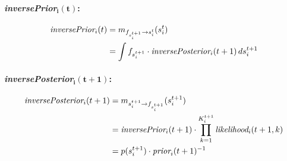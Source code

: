 \documentclass[11pt,twoside,spanish]{report} %
\begin{document}
\paragraph{\emph{inversePrior}$\bm{_i(t)}$: }

\begin{equation}
\begin{split}
\emph{inversePrior}_i(t) &= m_{f_{s_i^{t+1}} \rightarrow s_i^t}(s_i^t) \\
&= \int f_{s_i^{t+1}} \cdot \emph{inversePosterior}_i(t+1) \, ds_i^{t+1}
\end{split}
\end{equation}

\paragraph{\emph{inversePosterior}$\bm{_i(t+1)}$: }

\begin{equation}
\begin{split}
\emph{inversePosterior}_i(t+1) &= m_{s_i^{t+1} \rightarrow f_{s_i^{t+1}}}(s_i^{t+1}) \\
&= \emph{inversePrior}_i(t+1) \cdot \prod_{k=1}^{K_i^{t+1}} \emph{likelihood}_i(t+1,k) \\
&= p(s_i^{t+1}) \cdot \emph{prior}_i(t+1)^{-1}
\end{split}
\end{equation}
\end{document}
